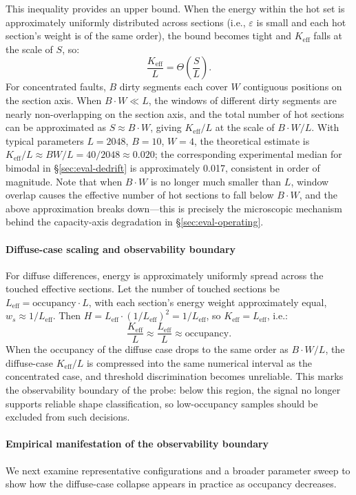 This inequality provides an upper bound. When the energy within the hot set is approximately uniformly distributed across sections (i.e., $\varepsilon$ is small and each hot section's weight is of the same order), the bound becomes tight and $K_{\text{eff}}$ falls at the scale of $S$, so:
\[
\frac{K_{\text{eff}}}{L}=\Theta\!\left(\frac{S}{L}\right).
\]
For concentrated faults, $B$ dirty segments each cover $W$ contiguous positions on the section axis. When $B\cdot W\ll L$, the windows of different dirty segments are nearly non-overlapping on the section axis, and the total number of hot sections can be approximated as $S\approx B\cdot W$, giving $K_{\text{eff}}/L$ at the scale of $B\cdot W/L$. With typical parameters $L=2048$, $B=10$, $W=4$, the theoretical estimate is $K_{\text{eff}}/L \approx BW/L = 40/2048 \approx
0.020$; the corresponding experimental median for bimodal in \S\ref{sec:eval-dedrift} is approximately 0.017, consistent in order of magnitude. Note that when $B\cdot W$ is no longer much smaller than $L$, window overlap causes the effective number of hot sections to fall below $B\cdot
W$, and the above approximation breaks down---this is precisely the microscopic mechanism behind the capacity-axis degradation in \S\ref{sec:eval-operating}.

\paragraph{Diffuse-case scaling and observability boundary}
For diffuse differences, energy is approximately uniformly spread across the touched effective sections. Let the number of touched sections be $L_{\text{eff}} = \text{occupancy}\cdot L$, with each section's energy weight approximately equal, $w_s
\approx 1/L_{\text{eff}}$. Then $H = L_{\text{eff}} \cdot (1/L_{\text{eff}})^2 = 1/L_{\text{eff}}$, so $K_{\text{eff}} = L_{\text{eff}}$, i.e.:
\[
\frac{K_{\text{eff}}}{L}\approx \frac{L_{\text{eff}}}{L}\approx \text{occupancy}.
\]
When the occupancy of the diffuse case drops to the same order as $B\cdot W/L$, the diffuse-case $K_{\text{eff}}/L$ is compressed into the same numerical interval as the concentrated case, and threshold discrimination becomes unreliable. This marks the observability boundary of the probe: below this region, the signal no longer supports reliable shape classification, so low-occupancy samples should be excluded from such decisions.

\paragraph{Empirical manifestation of the observability boundary}
We next examine representative configurations and a broader parameter sweep to show how the diffuse-case collapse appears in practice as occupancy decreases.

